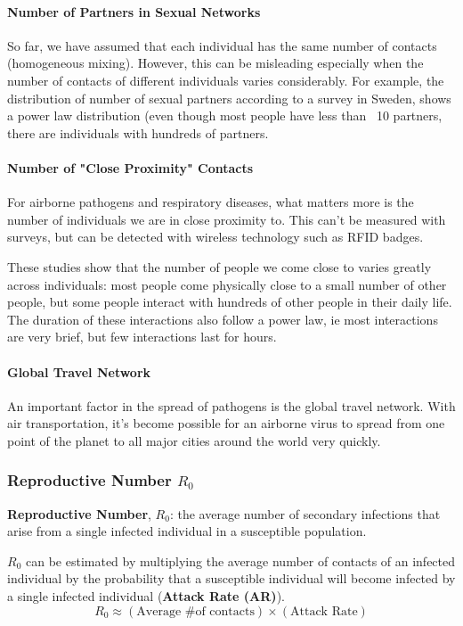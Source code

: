 \documentclass[11pt]{scrartcl} %
\begin{document}
\paragraph{Number of Partners in Sexual Networks}
So far, we have assumed that each individual has the same number of contacts (homogeneous mixing). However, this can be misleading especially when the number of contacts of different individuals varies considerably. For example, the distribution of number of sexual partners according to a survey in Sweden, shows a power law distribution (even though most people have less than ~10 partners, there are individuals with hundreds of partners.

\paragraph{Number of "Close Proximity" Contacts}
For airborne pathogens and respiratory diseases, what matters more is the number of individuals we are in close proximity to. This can't be measured with surveys, but can be detected with wireless technology such as RFID badges.

These studies show that the number of people we come close to varies greatly across individuals: most people come physically close to a small number of other people, but some people interact with hundreds of other people in their daily life. The duration of these interactions also follow a power law, ie most interactions are very brief, but few interactions last for hours.

\paragraph{Global Travel Network}
An important factor in the spread of pathogens is the global travel network. With air transportation, it's become possible for an airborne virus to spread from one point of the planet to all major cities around the world very quickly.

\subsubsection{Reproductive Number $R_0$}
\textbf{Reproductive Number}, $R_0$: the average number of secondary infections that arise from a single infected individual in a susceptible population.

$R_0$ can be estimated by multiplying the average number of contacts of an infected individual by the probability that a susceptible individual will become infected by a single infected individual (\textbf{Attack Rate (AR)}).
\[ R_0 \approx \left( \text{Average \# of contacts} \right) \times  \left( \text{Attack Rate} \right)\]
\end{document}
